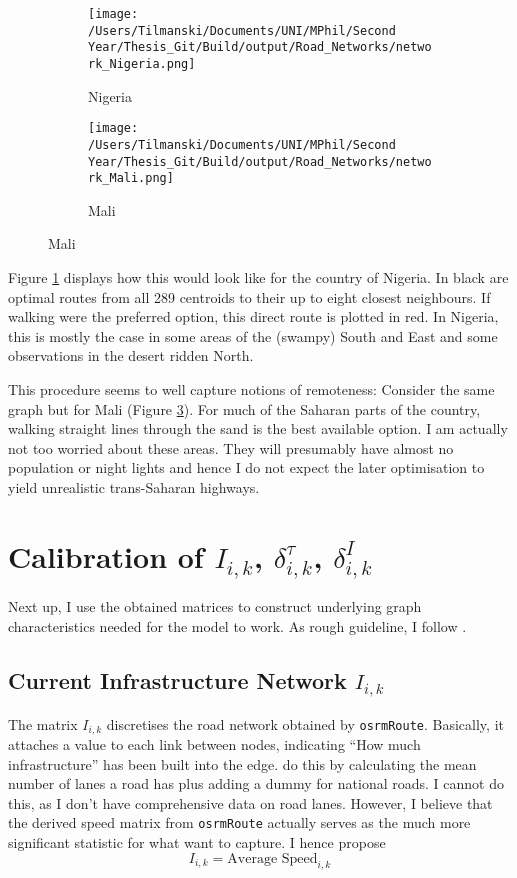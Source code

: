 \documentclass[11pt, oneside]{article}   	%
\begin{document}
\begin{figure}[h]
\centering
\caption{Road Networks for different countries as scraped off OSM}

\begin{subfigure}[c]{0.48\textwidth}
\texttt{[image: /Users/Tilmanski/Documents/UNI/MPhil/Second Year/Thesis\_Git/Build/output/Road\_Networks/network\_Nigeria.png]}
\caption{Nigeria}
\label{fig:nigeria}
\end{subfigure}
\begin{subfigure}[c]{0.48\textwidth}
\texttt{[image: /Users/Tilmanski/Documents/UNI/MPhil/Second Year/Thesis\_Git/Build/output/Road\_Networks/network\_Mali.png]}
\caption{Mali}
\label{fig:Mali}
\end{subfigure}

\end{figure}

Figure \ref{fig:nigeria} displays how this would look like for the country of Nigeria. In black are optimal routes from all 289 centroids to their up to eight closest neighbours. If walking were the preferred option, this direct route is plotted in red. In Nigeria, this is mostly the case in some areas of the (swampy) South and East and some observations in the desert ridden North.

This procedure seems to well capture notions of remoteness: Consider the same graph but for Mali (Figure \ref{fig:Mali}). For much of the Saharan parts of the country, walking straight lines through the sand is the best available option. I am actually not too worried about these areas. They will presumably have almost no population or night lights and hence I do not expect the later optimisation to yield unrealistic trans-Saharan highways.

\section{Calibration of $I_{i,k}$, $\delta^{\tau}_{i,k}$, $\delta^{I}_{i,k}$}

Next up, I use the obtained matrices to construct underlying graph characteristics needed for the model to work. As rough guideline, I follow \cite{fajgelbaum_optimal_2017}.

\subsection{Current Infrastructure Network $I_{i,k}$}
The matrix $I_{i,k}$ discretises the road network obtained by \texttt{osrmRoute}. Basically, it attaches a value to each link between nodes, indicating ``How much infrastructure'' has been built into the edge. \cite{fajgelbaum_optimal_2017} do this by calculating the mean number of lanes a road has plus adding a dummy for national roads. I cannot do this, as I don't have comprehensive data on road lanes. However, I believe that the derived speed matrix from \texttt{osrmRoute} actually serves as the much more significant statistic for what \citeauthor{fajgelbaum_optimal_2017} want to capture. I hence propose
\begin{equation}
  I_{i,k} = \textrm{Average Speed}_{i,k}
\end{equation}
\end{document}
